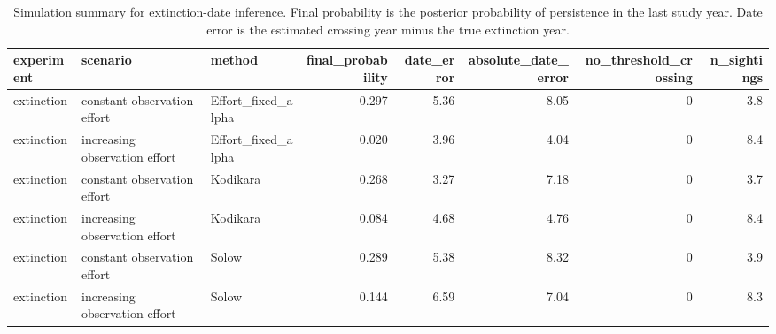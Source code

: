 \begin{table}

\caption{Simulation summary for extinction-date inference. Final probability is the posterior probability of persistence in the last study year. Date error is the estimated crossing year minus the true extinction year.}
\centering
\begin{tabular}[t]{lllrrrrr}
\toprule
experiment & scenario & method & final\_probability & date\_error & absolute\_date\_error & no\_threshold\_crossing & n\_sightings\\
\midrule
extinction & constant observation effort & Effort\_fixed\_alpha & 0.297 & 5.36 & 8.05 & 0 & 3.8\\
extinction & increasing observation effort & Effort\_fixed\_alpha & 0.020 & 3.96 & 4.04 & 0 & 8.4\\
extinction & constant observation effort & Kodikara & 0.268 & 3.27 & 7.18 & 0 & 3.7\\
extinction & increasing observation effort & Kodikara & 0.084 & 4.68 & 4.76 & 0 & 8.4\\
extinction & constant observation effort & Solow & 0.289 & 5.38 & 8.32 & 0 & 3.9\\
\addlinespace
extinction & increasing observation effort & Solow & 0.144 & 6.59 & 7.04 & 0 & 8.3\\
\bottomrule
\end{tabular}
\end{table}

